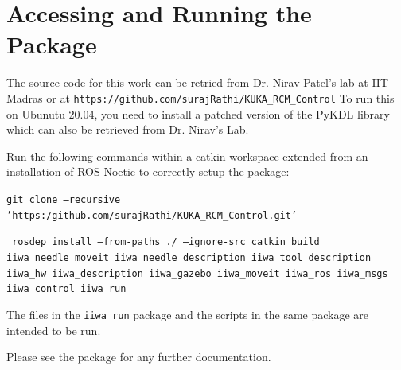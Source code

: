 \documentclass[BTech]{iitmdiss}
\begin{document}
    \chapter{Accessing and Running the Package} \label{ch:code}

    The source code for this work can be retried from Dr. Nirav Patel's lab at IIT Madras or at \texttt{https://github.com/surajRathi/KUKA\_RCM\_Control}
    To run this on Ubunutu 20.04, you need to install a patched version of the PyKDL library which can also be retrieved from Dr. Nirav's Lab.

    Run the following commands within a catkin workspace extended from an installation of ROS Noetic to correctly setup the package:


    \indent\texttt{git clone --recursive 'https:/github.com/surajRathi/KUKA\_RCM\_Control.git'}


    \indent\texttt{
        rosdep install --from-paths ./ --ignore-src catkin build iiwa\_needle\_moveit iiwa\_needle\_description iiwa\_tool\_description iiwa\_hw iiwa\_description iiwa\_gazebo iiwa\_moveit iiwa\_ros iiwa\_msgs iiwa\_control iiwa\_run
    }


    The files in the \texttt{iiwa\_run} package and the scripts in the same package are intended to be run.

    Please see the package for any further documentation.

    

    \begin{singlespace}
        
    \end{singlespace}
\end{document}
